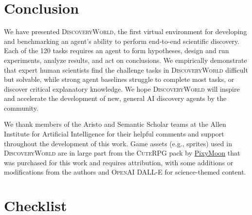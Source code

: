 \documentclass{article}
\newcommand{\env}{\textsc{DiscoveryWorld}\xspace}
\begin{document}
\section{Conclusion}

We have presented \env, the first virtual environment for developing and benchmarking an agent's ability to perform end-to-end scientific discovery.  Each of the 120 tasks requires an agent to form hypotheses, design and run experiments, analyze results, and act on conclusions.  We empirically demonstrate that expert human scientists find the challenge tasks in \env difficult but solvable, while strong agent baselines struggle to complete most tasks, or discover critical explanatory knowledge.  We hope \env will inspire and accelerate the development of new, general AI discovery agents by the community. 


\begin{ack}
We thank members of the Aristo and Semantic Scholar teams at the Allen Institute for Artificial Intelligence for their helpful comments and support throughout the development of this work.  Game assets (e.g., sprites) used in \env are in large part from the \textsc{CuteRPG} pack by \href{https://pixymoon.itch.io/}{PixyMoon} that was purchased for this work and requires attribution, with some additions or modifications from the authors and \textsc{OpenAI DALL-E} for science-themed content.
\end{ack}





\clearpage
\section*{Checklist}
\end{document}
